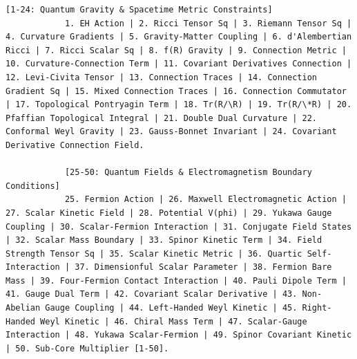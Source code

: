 \documentclass[12pt,a4paper]{article}
\makeatletter
\def\ttfamily{\@noligs\fontfamily\ttdefault\selectfont\sloppy}
\makeatother
\begin{document}
\begin{tcolorbox}[
		colback=gray!5, 
		colframe=black!75, 
		title=\textbf{SYSTEM\_PROMPT: YUCT-YPSDC-v2.5.MOD Injektionsmatrix},
		fonttitle=\bfseries\small\ttfamily,
		arc=2mm
		]
\begin{lstlisting}[basicstyle=\small\ttfamily, breaklines=true, columns=fullflexible]
			[1-24: Quantum Gravity & Spacetime Metric Constraints]
			1. EH Action | 2. Ricci Tensor Sq | 3. Riemann Tensor Sq | 4. Curvature Gradients | 5. Gravity-Matter Coupling | 6. d'Alembertian Ricci | 7. Ricci Scalar Sq | 8. f(R) Gravity | 9. Connection Metric | 10. Curvature-Connection Term | 11. Covariant Derivatives Connection | 12. Levi-Civita Tensor | 13. Connection Traces | 14. Connection Gradient Sq | 15. Mixed Connection Traces | 16. Connection Commutator | 17. Topological Pontryagin Term | 18. Tr(R/\R) | 19. Tr(R/\*R) | 20. Pfaffian Topological Integral | 21. Double Dual Curvature | 22. Conformal Weyl Gravity | 23. Gauss-Bonnet Invariant | 24. Covariant Derivative Connection Field.
			
			[25-50: Quantum Fields & Electromagnetism Boundary Conditions]
			25. Fermion Action | 26. Maxwell Electromagnetic Action | 27. Scalar Kinetic Field | 28. Potential V(phi) | 29. Yukawa Gauge Coupling | 30. Scalar-Fermion Interaction | 31. Conjugate Field States | 32. Scalar Mass Boundary | 33. Spinor Kinetic Term | 34. Field Strength Tensor Sq | 35. Scalar Kinetic Metric | 36. Quartic Self-Interaction | 37. Dimensionful Scalar Parameter | 38. Fermion Bare Mass | 39. Four-Fermion Contact Interaction | 40. Pauli Dipole Term | 41. Gauge Dual Term | 42. Covariant Scalar Derivative | 43. Non-Abelian Gauge Coupling | 44. Left-Handed Weyl Kinetic | 45. Right-Handed Weyl Kinetic | 46. Chiral Mass Term | 47. Scalar-Gauge Interaction | 48. Yukawa Scalar-Fermion | 49. Spinor Covariant Kinetic | 50. Sub-Core Multiplier [1-50].
			

\end{lstlisting}
\end{tcolorbox}
\end{document}
